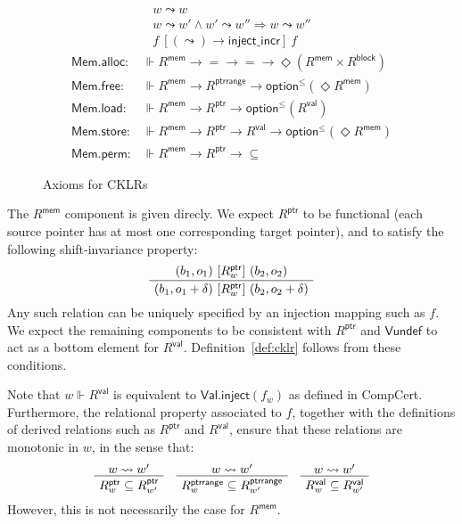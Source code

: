 \documentclass[acmsmall,timestamp,review,anonymous]{acmart}
\newcommand{\kw}[1]{\ensuremath{ \mathsf{#1} }}
\newcommand{\ifr}[1]{\ [{#1}]\ }
\begin{document}
\begin{figure} %
  \begin{gather*}
    w \leadsto w \\
    w \leadsto w' \wedge w' \leadsto w'' \Rightarrow w \leadsto w'' \\
    f \ifr{(\leadsto) \rightarrow \kw{inject\_incr}} f
  \end{gather*}
  \begin{align*}
      \kw{Mem.alloc} :
        &\Vdash R^\kw{mem} \rightarrow {=} \rightarrow {=} \rightarrow
        \Diamond (R^\kw{mem} \times R^\kw{block})
      \\
      \kw{Mem.free} :
        &\Vdash R^\kw{mem} \rightarrow R^\kw{ptrrange} \rightarrow
        \kw{option}^\le(\Diamond R^\kw{mem})
      \\
      \kw{Mem.load} :
        &\Vdash R^\kw{mem} \rightarrow R^\kw{ptr} \rightarrow
        \kw{option}^\le(R^\kw{val})
      \\
      \kw{Mem.store} :
        &\Vdash R^\kw{mem} \rightarrow R^\kw{ptr} \rightarrow R^\kw{val} \rightarrow
        \kw{option}^\le(\Diamond R^\kw{mem})
      \\
      \kw{Mem.perm} :
        &\Vdash R^\kw{mem} \rightarrow R^\kw{ptr} \rightarrow {\subseteq}
  \end{align*}
  \caption{Axioms for CKLRs}
  \label{fig:cklr-def}
\end{figure}

The $R^\kw{mem}$ component is given direcly.
We expect $R^\kw{ptr}$ to be functional
(each source pointer has at most one corresponding target pointer),
and to satisfy the following shift-invariance property:
\[
  \AxiomC{$(b_1, o_1) \ifr{R^\kw{ptr}_w} (b_2, o_2)$}
  \UnaryInfC{$(b_1, o_1 + \delta) \ifr{R^\kw{ptr}_w} (b_2, o_2 + \delta)$}
  \DisplayProof
\]
Any such relation can be uniquely specified by
an injection mapping such as $f$.
We expect the remaining components to be consistent with $R^\kw{ptr}$
and $\kw{Vundef}$ to act as a bottom element for $R^\kw{val}$.
Definition~\ref{def:cklr} follows from these conditions.

Note that $w \Vdash R^\kw{val}$
is equivalent to $\kw{Val.inject}(f_w)$
as defined in CompCert.
Furthermore, the relational property associated to $f$,
together with the definitions of
derived relations such as $R^\kw{ptr}$ and $R^\kw{val}$,
ensure that these relations are monotonic in $w$,
in the sense that:
\[
  \AxiomC{$w \leadsto w'$}
  \UnaryInfC{$R^\kw{ptr}_w \subseteq R^\kw{ptr}_{w'}$}
  \DisplayProof
  \quad
  \AxiomC{$w \leadsto w'$}
  \UnaryInfC{$R^\kw{ptrrange}_w \subseteq R^\kw{ptrrange}_{w'}$}
  \DisplayProof
  \quad
  \AxiomC{$w \leadsto w'$}
  \UnaryInfC{$R^\kw{val}_w \subseteq R^\kw{val}_{w'}$}
  \DisplayProof
\]
However,
this is not necessarily the case for $R^\kw{mem}$.
\end{document}
